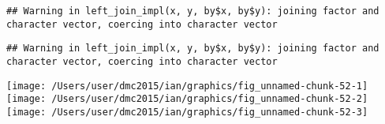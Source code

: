 \documentclass[10pt]{report}
\newenvironment{Shaded}{}{}
\newcommand{\KeywordTok}[1]{\textcolor[rgb]{0.00,0.44,0.13}{\textbf{{#1}}}}
\newcommand{\DataTypeTok}[1]{\textcolor[rgb]{0.56,0.13,0.00}{{#1}}}
\newcommand{\StringTok}[1]{\textcolor[rgb]{0.25,0.44,0.63}{{#1}}}
\newcommand{\NormalTok}[1]{{#1}}
\begin{document}
\begin{verbatim}
## Warning in left_join_impl(x, y, by$x, by$y): joining factor and character vector, coercing into character vector
\end{verbatim}

\begin{Shaded}
\end{Shaded}

\begin{verbatim}
## Warning in left_join_impl(x, y, by$x, by$y): joining factor and character vector, coercing into character vector
\end{verbatim}

\begin{Shaded}
\end{Shaded}

\begin{center}\texttt{[image: /Users/user/dmc2015/ian/graphics/fig\_unnamed-chunk-52-1]} \texttt{[image: /Users/user/dmc2015/ian/graphics/fig\_unnamed-chunk-52-2]} \texttt{[image: /Users/user/dmc2015/ian/graphics/fig\_unnamed-chunk-52-3]} \end{center}
\end{document}
